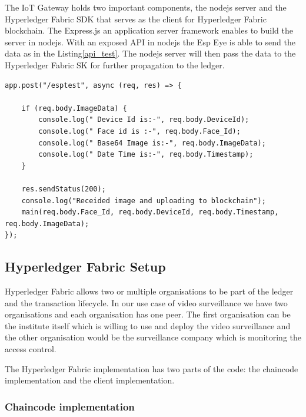 The IoT Gateway holds two important components, the nodejs server and the Hyperledger Fabric SDK that serves as the client for Hyperledger Fabric blockchain. The Express.js an application server framework enables to build the server in nodejs. With an exposed API in nodejs the Esp Eye is able to send the data as in the Listing\ref{api_test}. The nodejs server will then pass the data to the Hyperledger Fabric SK for further propagation to the ledger.



\begin{lstlisting}[caption={The exposed API for handling requests coming from Esp Eye},label=api_test, captionpos=b]
app.post("/esptest", async (req, res) => {

    if (req.body.ImageData) {
        console.log(" Device Id is:-", req.body.DeviceId);
        console.log(" Face id is :-", req.body.Face_Id);
        console.log(" Base64 Image is:-", req.body.ImageData);
        console.log(" Date Time is:-", req.body.Timestamp);
    }

    res.sendStatus(200);
    console.log("Receided image and uploading to blockchain");
    main(req.body.Face_Id, req.body.DeviceId, req.body.Timestamp, req.body.ImageData);
});
\end{lstlisting}



\subsection{Hyperledger Fabric Setup}
Hyperledger Fabric allows two or multiple organisations to be part of the ledger and the transaction lifecycle. In our use case of video surveillance we have two organisations and each organisation has one peer. The first organisation can be the institute itself which is willing to use and deploy the video surveillance and the other organisation would be the surveillance company which is monitoring the access control. 

The Hyperledger Fabric implementation has two parts of the code: the chaincode implementation and the client implementation. 

\subsubsection{Chaincode implementation}

